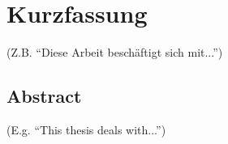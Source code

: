 
\thispagestyle{scrplain}

\section*{Kurzfassung}

(Z.B. ``Diese Arbeit beschäftigt sich mit...'')

\blindtext

\newpage

\begin{otherlanguage}{english}
\thispagestyle{scrplain}

\section*{Abstract}

(E.g. ``This thesis deals with...'')

\blindtext

\end{otherlanguage}

